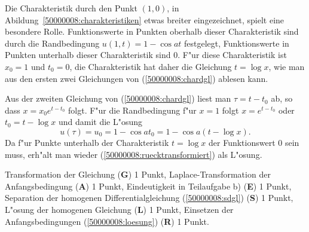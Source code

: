 \begin{diskussion}
Die Charakteristik durch den Punkt $(1,0)$, in Abildung~\ref{50000008:charakteristiken} etwas breiter eingezeichnet, spielt eine besondere Rolle.
Funktionswerte in Punkten oberhalb dieser Charakteristik sind durch die 
Randbedingung $u(1,t)=1-\cos at$ festgelegt, Funktionswerte in Punkten
unterhalb dieser Charakteristik sind $0$.
F"ur diese Charakteristik ist $x_0=1$ und $t_0=0$, die Charakteristik
hat daher die Gleichung $t=\log x$, wie man aus den ersten zwei Gleichungen
von (\ref{50000008:chardgl}) ablesen kann.

Aus der zweiten Gleichung von (\ref{50000008:chardgl})
liest man $\tau=t-t_0$ ab, so dass 
$x=x_0e^{t-t_0}$ folgt.
F"ur die Randbedingung f"ur $x=1$ folgt $x=e^{t-t_0}$
oder $t_0=t-\log x$ und damit die L"osung 
\[
u(\tau)=u_0=1-\cos at_0=1-\cos a(t-\log x).
\]
Da f"ur Punkte unterhalb der Charakteristik $t=\log x$ der Funktionswert $0$
sein muss, erh"alt man wieder (\ref{50000008:ruecktransformiert}) als L"osung.
\end{diskussion}

\begin{bewertung}
Transformation der Gleichung ({\bf G}) 1 Punkt,
Laplace-Transformation der Anfangsbedingung ({\bf A}) 1 Punkt,
Eindeutigkeit in Teilaufgabe b) ({\bf E}) 1 Punkt,
Separation der homogenen Differentialgleichung (\ref{50000008:sdgl})
({\bf S}) 1 Punkt,
L"osung der homogenen Gleichung ({\bf L}) 1 Punkt,
Einsetzen der Anfangsbedingungen (\ref{50000008:loesung}) ({\bf R}) 1 Punkt.
\end{bewertung}
